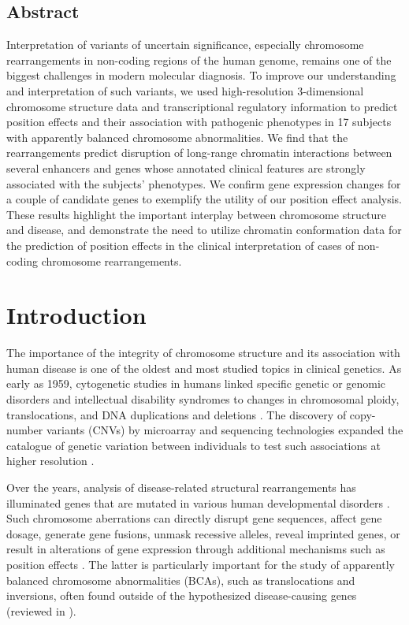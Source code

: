 \documentclass[a4paper,twoside=true,openright,parskip=full,chapterprefix=true,11pt,headings=normal,bibliography=totoc,listof=totoc,titlepage=on,captions=tableabove,draft=false]{scrreprt}
\theoremstyle{definition}
\theoremstyle{definition}
\theoremstyle{definition}
\theoremstyle{remark}
\begin{document}
\hypertarget{abstract-3}{%
\subsection*{Abstract}\label{abstract-3}}

Interpretation of variants of uncertain significance, especially
chromosome rearrangements in non-coding regions of the human genome,
remains one of the biggest challenges in modern molecular diagnosis. To
improve our understanding and interpretation of such variants, we used
high-resolution 3-dimensional chromosome structure data and
transcriptional regulatory information to predict position effects and
their association with pathogenic phenotypes in 17 subjects with
apparently balanced chromosome abnormalities. We find that the
rearrangements predict disruption of long-range chromatin interactions
between several enhancers and genes whose annotated clinical features
are strongly associated with the subjects' phenotypes. We confirm gene
expression changes for a couple of candidate genes to exemplify the
utility of our position effect analysis. These results highlight the
important interplay between chromosome structure and disease, and
demonstrate the need to utilize chromatin conformation data for the
prediction of position effects in the clinical interpretation of cases
of non-coding chromosome rearrangements.

\hypertarget{introduction-2}{%
\section{Introduction}\label{introduction-2}}

The importance of the integrity of chromosome structure and its
association with human disease is one of the oldest and most studied
topics in clinical genetics. As early as 1959, cytogenetic studies in
humans linked specific genetic or genomic disorders and intellectual
disability syndromes to changes in chromosomal ploidy, translocations,
and DNA duplications and deletions
\citep{Lejeune1959, Ford1959, Jacobs1959, Stankiewicz2002, Iafrate2004}.
The discovery of copy-number variants (CNVs) by microarray and
sequencing technologies expanded the catalogue of genetic variation
between individuals to test such associations at higher resolution
\citep{Iafrate2004, Sebat2004, Hinds2006, Conrad2006, Conrad2010, Korbel2007, Stankiewicz2010, Altshuler2010, Carvalho2016}.

Over the years, analysis of disease-related structural rearrangements
has illuminated genes that are mutated in various human developmental
disorders \citep{Zhang2009, Theisen2010, Nambiar2011, Higgins2008}. Such
chromosome aberrations can directly disrupt gene sequences, affect gene
dosage, generate gene fusions, unmask recessive alleles, reveal
imprinted genes, or result in alterations of gene expression through
additional mechanisms such as position effects \citep{Zhang2009}. The
latter is particularly important for the study of apparently balanced
chromosome abnormalities (BCAs), such as translocations and inversions,
often found outside of the hypothesized disease-causing genes (reviewed
in \citep{Kleinjan2005}).
\end{document}
